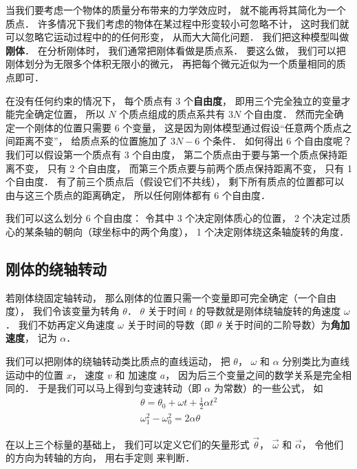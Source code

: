 

当我们要考虑一个物体的质量分布带来的力学效应时， 就不能再将其简化为一个质点． 许多情况下我们考虑的物体在某过程中形变较小可忽略不计， 这时我们就可以忽略它运动过程中的的任何形变， 从而大大简化问题． 我们把这种模型叫做\textbf{刚体}． 在分析刚体时， 我们通常把刚体看做是质点系． 要这么做， 我们可以把刚体划分为无限多个体积无限小的微元， 再把每个微元近似为一个质量相同的质点即可． 

在没有任何约束的情况下， 每个质点有 3 个\textbf{自由度}， 即用三个完全独立的变量才能完全确定位置， 所以 $N$ 个质点组成的质点系共有 $3N$ 个自由度． 然而完全确定一个刚体的位置只需要 6 个变量， 这是因为刚体模型通过假设“任意两个质点之间距离不变”， 给质点系的位置施加了 $3N - 6$ 个条件． 如何得出 6 个自由度呢？ 我们可以假设第一个质点有 3 个自由度， 第二个质点由于要与第一个质点保持距离不变， 只有 2 个自由度， 而第三个质点要与前两个质点保持距离不变， 只有 1 个自由度． 有了前三个质点后（假设它们不共线）， 剩下所有质点的位置都可以由与这三个质点的距离确定， 所以任何刚体都有 6 个自由度．

我们可以这么划分 6 个自由度： 令其中 3 个决定刚体质心的位置， 2 个决定过质心的某条轴的朝向（球坐标中的两个角度）， 1 个决定刚体绕这条轴旋转的角度．

\subsection{刚体的绕轴转动}

若刚体绕固定轴转动， 那么刚体的位置只需一个变量即可完全确定（一个自由度）， 我们令该变量为转角 $\theta$． $\theta$ 关于时间 $t$ 的导数就是刚体绕轴旋转的角速度 $\omega$． 我们不妨再定义角速度 $\omega$ 关于时间的导数（即 $\theta$ 关于时间的二阶导数）为\textbf{角加速度}， 记为 $\alpha$．

我们可以把刚体的绕轴转动类比质点的直线运动， 把 $\theta$， $\omega$ 和 $\alpha$ 分别类比为直线运动中的位置 $x$， 速度 $v$ 和 加速度 $a$， 因为后三个变量之间的数学关系是完全相同的． 于是我们可以马上得到匀变速转动（即 $\alpha$ 为常数）的一些公式， 如
\begin{gather}
\theta = \theta_0 + \omega t + \frac 12 \alpha t^2\\
\omega_1^2 - \omega_0^2 = 2\alpha \theta
\end{gather}

在以上三个标量的基础上， 我们可以定义它们的矢量形式 $\vec \theta$， $\vec \omega$ 和 $\vec \alpha$， 令他们的方向为转轴的方向， 用右手定则%
来判断．

